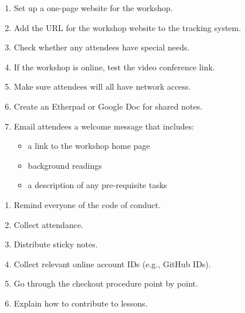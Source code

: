 \begin{enumerate}

\item
  Set up a one-page website for the workshop.

\item
  Add the URL for the workshop website to the tracking system.

\item
  Check whether any attendees have special needs.

\item
  If the workshop is online, test the video conference link.

\item
  Make sure attendees will all have network access.

\item
  Create an Etherpad or Google Doc for shared notes.

\item
  Email attendees a welcome message that includes:

  \begin{itemize}

    \item
      a link to the workshop home page

    \item
      background readings

    \item
      a description of any pre-requisite tasks

  \end{itemize}

\end{enumerate}


\begin{enumerate}

\item
  Remind everyone of the code of conduct.

\item
  Collect attendance.

\item
  Distribute sticky notes.

\item
  Collect relevant online account IDs (e.g., GitHub IDs).

\item
  Go through the checkout procedure point by point.

\item
  Explain how to contribute to lessons.

\end{enumerate}

